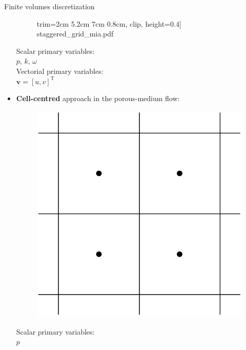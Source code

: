 \documentclass{beamer}
\begin{document}
\begin{frame}{Finite volumes discretization}
\begin{itemize}
\begin{minipage}{0.5\textwidth}
\begin{figure}
			trim={2cm 5.2cm 7cm 0.8cm}, clip, height=0.4\textheight]%
			{staggered_grid_mia.pdf}
			\vspace{0.2cm}
		\end{figure}
	\end{minipage}%
	\begin{minipage}{0.5\textwidth}
		\centering
		Scalar primary variables:\\
		$p$, $k$, $\omega$\\
		Vectorial primary variables:\\
		$\mathbf{v}=[u,v]^\mathrm{T}$
	\end{minipage}
	\item \textbf{Cell-centred} approach in the porous-medium flow:
	\begin{minipage}{0.5\textwidth}%
		\begin{figure}
			\vspace{0.1cm}
			\includegraphics[height=0.3\textheight]{cellcentred.pdf}
		\end{figure}
	\end{minipage}%
	\begin{minipage}{0.5\textwidth}
		\centering
		Scalar primary variables:\\
		$p$
	\end{minipage}%
\end{itemize}
\end{frame}
\end{document}
